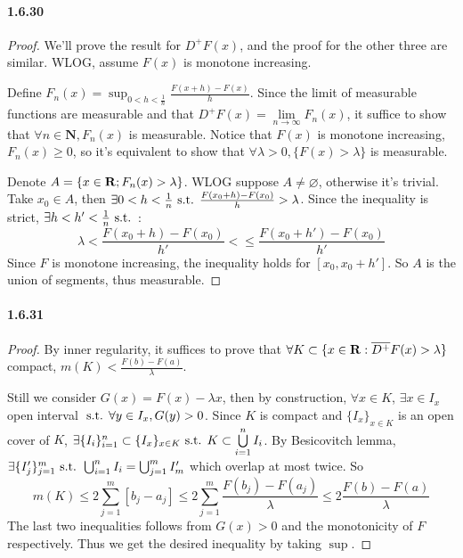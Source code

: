 \documentclass{article}
\begin{document}
\paragraph{1.6.30}
\begin{proof}
We'll prove the result for $D^+F(x)$, and the proof for the other three are similar. WLOG, assume $F(x)$ is monotone increasing.

Define $F_n(x)=\sup_{0<h<\frac 1 n}\frac{F(x+h)-F(x)}{h}$. Since the limit of measurable functions are measurable and that $D^+F(x)=\lim\limits_{n\to\infty}F_n(x)$, it suffice to show that $\forall n\in\mathbf{N}, F_n(x)$ is measurable. Notice that $F(x)$ is monotone increasing, $F_n(x)\geq 0$, so it's equivalent to show that $\forall \lambda>0, \{F(x)>\lambda\}$ is measurable. 

Denote $A=\{x\in\mathbf{R}; F_n(x)>\lambda\}$. WLOG suppose $A\neq\varnothing$, otherwise it's trivial. Take $x_0\in A$, then $\exists 0<h<\frac{1}{n}\text{ s.t. } \frac{F(x_0+h)-F(x_0)}{h}>\lambda$. Since the inequality is strict, $\exists h<h'<\frac 1 n\text{ s.t. }$:
\[\lambda<\frac{F(x_0+h)-F(x_0)}{h'}<\leq \frac{F(x_0+h')-F(x_0)}{h'}\]
Since $F$ is monotone increasing, the inequality holds for $[x_0,x_0+h']$. So $A$ is the union of segments, thus measurable.
\end{proof}

\paragraph{1.6.31}
\begin{proof}
By inner regularity, it suffices to prove that $\forall K\subset \{x\in\mathbf{R}:\overline{D^+}F(x)>\lambda\}$ compact, $m(K)<\frac{F(b)-F(a)}{\lambda}$. 

Still we consider $G(x)=F(x)-\lambda x$, then by construction, $\forall x\in K$, $\exists x\in I_x$ open interval $\text{ s.t. } \forall y\in I_x, G(y)>0$. Since $K$ is compact and $\{I_x\}_{x\in K}$ is an open cover of $K$, $\exists \{I_i\}_{i=1}^n\subset \{I_x\}_{x\in K}\text{ s.t. } K\subset \bigcup\limits_{i=1}^n I_i$. By Besicovitch lemma, $\exists \{I'_j\}_{j=1}^m\text{ s.t. } \bigcup_{i=1}^n I_i=\bigcup_{j=1}^m I'_m$ which overlap at most twice. So 
\[m(K)\leq 2\sum_{j=1}^m [b_j-a_j]\leq 2\sum_{j=1}^m \frac{F(b_j)-F(a_j)}{\lambda}\leq 2\frac{F(b)-F(a)}{\lambda}\]
The last two inequalities follows from $G(x)>0$ and the monotonicity of $F$ respectively. Thus we get the desired inequality by taking $\sup$.
\end{proof}
\end{document}
